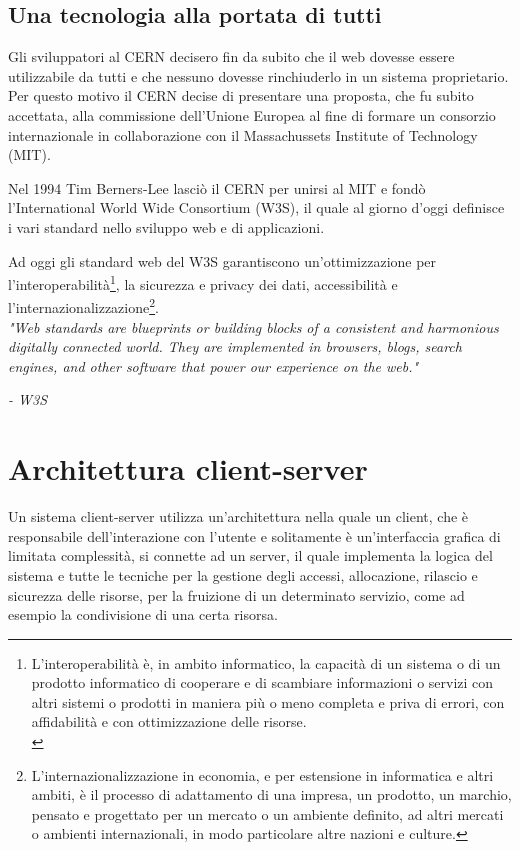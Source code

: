 \subsection{Una tecnologia alla portata di tutti}
Gli sviluppatori al CERN decisero fin da subito che il web dovesse essere utilizzabile da tutti e che nessuno dovesse rinchiuderlo in un sistema proprietario. Per questo motivo il CERN decise di presentare una proposta, che fu subito accettata, alla commissione dell'Unione Europea al fine di formare un consorzio internazionale in collaborazione con il Massachussets Institute of Technology (MIT).

Nel 1994 Tim Berners-Lee lasciò il CERN per unirsi al MIT e fondò l'International World Wide Consortium (W3S), il quale al giorno d'oggi definisce i vari standard nello sviluppo web e di applicazioni.

Ad oggi gli standard web del W3S garantiscono un'ottimizzazione per l'interoperabilità\footnote{L'interoperabilità è, in ambito informatico, la capacità di un sistema o di un prodotto informatico di cooperare e di scambiare informazioni o servizi con altri sistemi o prodotti in maniera più o meno completa e priva di errori, con affidabilità e con ottimizzazione delle risorse.\cite{interoperabilità} \\}, la sicurezza e privacy dei dati, accessibilità e l'internazionalizzazione\footnote{L'internazionalizzazione in economia, e per estensione in informatica e altri ambiti, è il processo di adattamento di una impresa, un prodotto, un marchio, pensato e progettato per un mercato o un ambiente definito, ad altri mercati o ambienti internazionali, in modo particolare altre nazioni e culture.\cite{internazionalizzazione}}.
\\

\textit{"Web standards are blueprints or building blocks of a consistent and harmonious digitally connected world. They are implemented in browsers, blogs, search engines, and other software that power our experience on the web."}\cite{w3sStandard}

\textit{\hspace{14.2cm}- W3S}
\newpage
\section{Architettura client-server}
Un sistema client-server utilizza un'architettura nella quale un client, che è responsabile dell'interazione con l'utente e solitamente è un'interfaccia grafica di limitata complessità, si connette ad un server, il quale implementa la logica del sistema e tutte le tecniche per la gestione degli accessi, allocazione, rilascio e sicurezza delle risorse, per la fruizione di un determinato servizio, come ad esempio la condivisione di una certa risorsa.\cite{clientServer1}\cite{clientServer2}

